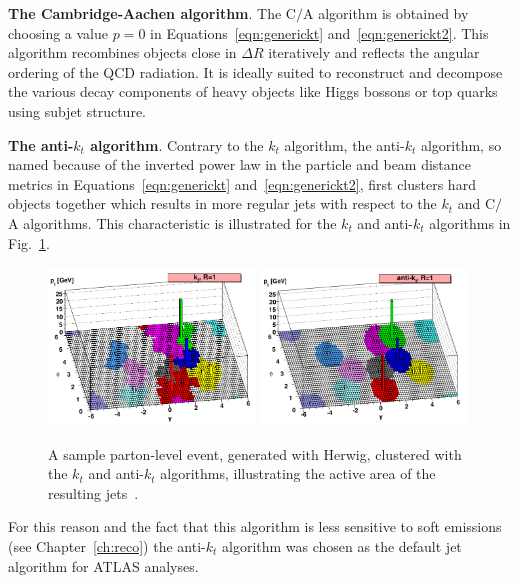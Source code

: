 \textbf{The Cambridge-Aachen algorithm}. The C$/$A algorithm is obtained by choosing a value $p=0$ in Equations~\ref{eqn:generickt} and~\ref{eqn:generickt2}. This algorithm recombines objects close in $\Delta R$ iteratively and reflects the angular ordering of the QCD radiation.  It is ideally suited to reconstruct and decompose the various decay components of heavy objects like Higgs bossons or top quarks using subjet structure.


\textbf{The anti-$k_t$ algorithm}. Contrary to the $k_t$ algorithm, the anti-$k_t$ algorithm, so named because of the inverted power law in the particle and beam distance metrics in Equations~\ref{eqn:generickt} and~\ref{eqn:generickt2}, first clusters hard objects together %
which results in more regular jets with respect to the $k_t$ and C$/$A algorithms. This characteristic is illustrated for the $k_t$ and anti-$k_t$ algorithms in Fig.~\ref{fig:CatchmentAreaFig}.

\begin{figure}[tp]
\centering
\includegraphics[width=0.49\textwidth]{areas_kt.png}
\includegraphics[width=0.49\textwidth]{areas-antikt.png}
\caption{A sample parton-level event, generated with {\sc Herwig}, clustered with the $k_t$ and anti-$k_t$ algorithms, illustrating the active area of the resulting jets~\cite{CatchmentArea}.}
\label{fig:CatchmentAreaFig}
\end{figure}


For this reason and the fact that this algorithm is less sensitive to soft emissions (see Chapter~\ref{ch:reco}) the anti-$k_t$ algorithm was chosen as the default jet algorithm for ATLAS analyses.

